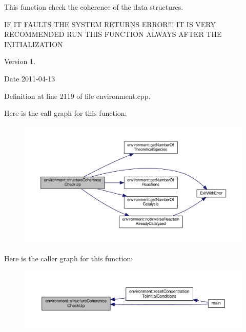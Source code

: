 This function check the coherence of the data structures. 

I\-F I\-T F\-A\-U\-L\-T\-S T\-H\-E S\-Y\-S\-T\-E\-M R\-E\-T\-U\-R\-N\-S E\-R\-R\-O\-R!!! I\-T I\-S V\-E\-R\-Y R\-E\-C\-O\-M\-M\-E\-N\-D\-E\-D R\-U\-N T\-H\-I\-S F\-U\-N\-C\-T\-I\-O\-N A\-L\-W\-A\-Y\-S A\-F\-T\-E\-R T\-H\-E I\-N\-I\-T\-I\-A\-L\-I\-Z\-A\-T\-I\-O\-N \begin{DoxyVersion}{Version}
1. 
\end{DoxyVersion}
\begin{DoxyDate}{Date}
2011-\/04-\/13 
\end{DoxyDate}


Definition at line 2119 of file environment.\-cpp.



Here is the call graph for this function\-:\nopagebreak
\begin{figure}[H]
\begin{center}
\leavevmode
\includegraphics[width=350pt]{a00011_a6606b08f25751a8796c13810962b385e_cgraph}
\end{center}
\end{figure}




Here is the caller graph for this function\-:\nopagebreak
\begin{figure}[H]
\begin{center}
\leavevmode
\includegraphics[width=350pt]{a00011_a6606b08f25751a8796c13810962b385e_icgraph}
\end{center}
\end{figure}


